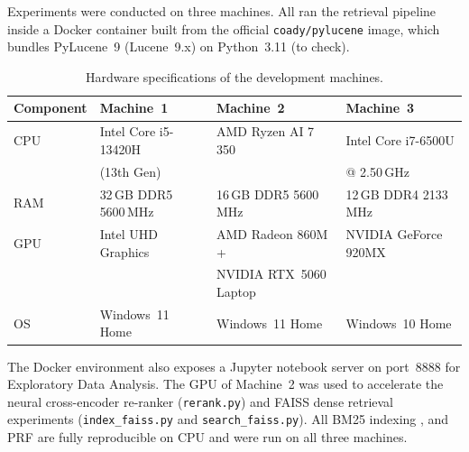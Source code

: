 Experiments were conducted on three machines. All ran the retrieval pipeline
inside a Docker container built from the official \texttt{coady/pylucene} image,
which bundles PyLucene~9 (Lucene~9.x) on Python~3.11 (to check).

\begin{table}[h]
  \caption{Hardware specifications of the development machines.}
  \label{tab:hardware}
  \centering
  \begin{tabular}{llll}
    \toprule
    Component & Machine~1 & Machine~2 & Machine~3 \\
    \midrule
    CPU & Intel Core i5-13420H  & AMD Ryzen AI 7 350    & Intel Core i7-6500U   \\
        & (13th Gen)            &                       & @ 2.50\,GHz           \\
    RAM & 32\,GB DDR5 5600\,MHz & 16\,GB DDR5 5600\,MHz & 12\,GB DDR4 2133\,MHz \\
    GPU & Intel UHD Graphics    & AMD Radeon 860M +     & NVIDIA GeForce 920MX  \\
        &                       & NVIDIA RTX~5060 Laptop&                       \\
    OS  & Windows~11 Home       & Windows~11 Home       & Windows~10 Home       \\
    \bottomrule
  \end{tabular}
\end{table}

The Docker environment also exposes a Jupyter notebook server on port~8888 for Exploratory Data Analysis. The GPU of Machine~2 was used to accelerate the neural cross-encoder re-ranker (\texttt{rerank.py}) and FAISS dense retrieval experiments (\texttt{index\_faiss.py} and \texttt{search\_faiss.py}). All BM25 indexing , and \ac{PRF}  are fully reproducible on \ac{CPU} and were run on all three machines.
